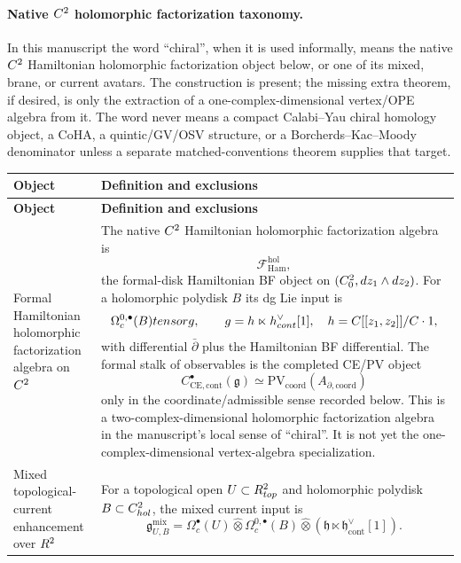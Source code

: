 \paragraph{Native \(C^2\) holomorphic factorization taxonomy.}
In this manuscript the word ``chiral'', when it is used informally, means
the native \(C^2\) Hamiltonian holomorphic factorization object below, or
one of its mixed, brane, or current avatars.  The construction is present;
the missing extra theorem, if desired, is only the extraction of a
one-complex-dimensional vertex/OPE algebra from it.  The word never means
a compact Calabi--Yau chiral homology object, a CoHA, a quintic/GV/OSV
structure, or a Borcherds--Kac--Moody denominator unless a separate
matched-conventions theorem supplies that target.
\begin{longtable}{@{}>{\raggedright\arraybackslash}p{}
  >{\raggedright\arraybackslash}p{}@{}}
\hline
\textbf{Object} & \textbf{Definition and exclusions}\\
\hline
\endfirsthead
\hline
\textbf{Object} & \textbf{Definition and exclusions}\\
\hline
\endhead
Formal Hamiltonian holomorphic factorization algebra on \(C^2\) &
The native \(C^2\) Hamiltonian holomorphic factorization algebra is
\[
  \mathcal F_{\mathrm{Ham}}^{\mathrm{hol}},
\]
the formal-disk Hamiltonian BF object on
\((C^2_0,dz_1\wedge dz_2)\).  For a holomorphic polydisk
\(B\) its dg Lie input is
\[
  \Omega^{0,\bullet}_c(B)tensor
  g,\qquad
  g=h\ltimes
  h^\vee_{cont}[1],
  \quad
  h=C[[z_1,z_2]]/C\cdot1 ,
\]
with differential \(\bar\partial\) plus the Hamiltonian BF differential.
The formal stalk of observables is the completed CE/PV object
\[
  C^\bullet_{\mathrm{CE},\mathrm{cont}}(\mathfrak g)
  \simeq
  \mathrm{PV}_{\mathrm{coord}}(A_{\partial,\mathrm{coord}})
\]
only in the coordinate/admissible sense recorded below.  This is a
two-complex-dimensional holomorphic factorization algebra in the
manuscript's local sense of ``chiral''.  It is not yet the
one-complex-dimensional vertex-algebra specialization.\\
\hline
Mixed topological-current enhancement over \(R^2\) &
For a topological open \(U\subset R^2_{top}\) and holomorphic
polydisk \(B\subset C^2_{hol}\), the mixed current input is
\[
  \mathfrak g^{\mathrm{mix}}_{U,B}
  =
  \Omega^\bullet_c(U)\widehat\otimes
  \Omega^{0,\bullet}_c(B)\widehat\otimes
  (\mathfrak h\ltimes\mathfrak h^\vee_{\mathrm{cont}}[1]).
\]
\end{longtable}
